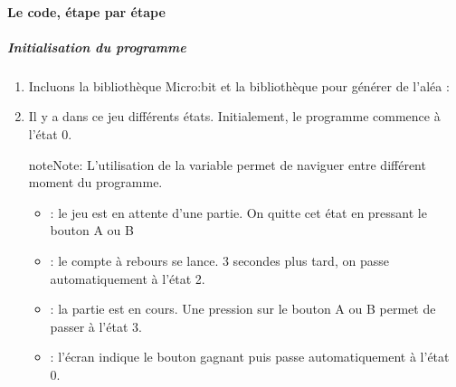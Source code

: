 \documentclass[letterpaper,10pt,french]{sphinxmanual}
\begin{document}
\paragraph{Le code, étape par étape}
\label{\detokenize{projets/goFast-python-coder:le-code-etape-par-etape}}

\subparagraph{Initialisation du programme}
\label{\detokenize{projets/goFast-python-coder:initialisation-du-programme}}\begin{enumerate}
\item {} 
Incluons la bibliothèque Micro:bit et la bibliothèque
 pour générer de l’aléa :

%
\begin{sphinxVerbatim}[commandchars=\\\{\}]
   
 
\end{sphinxVerbatim}

\item {} 
Il y a dans ce jeu différents états. Initialement, le programme
commence à l’état 0.

\begin{sphinxadmonition}{note}{Note:}
L’utilisation de la variable  permet de naviguer
entre différent moment du programme.
\end{sphinxadmonition}
\begin{itemize}
\item {} 
 : le jeu est en attente d’une partie.
On quitte cet état en pressant le bouton A ou B

\item {} 
 : le compte à rebours se lance.
3 secondes plus tard, on passe automatiquement à l’état 2.

\item {} 
 : la partie est en cours. Une pression sur le bouton
A ou B permet de passer à l’état 3.

\item {} 
 : l’écran indique le bouton gagnant puis passe
automatiquement à l’état 0.

\end{itemize}

%
\begin{sphinxVerbatim}[commandchars=\\\{\}]
  
\end{sphinxVerbatim}


\end{enumerate}
\end{document}
